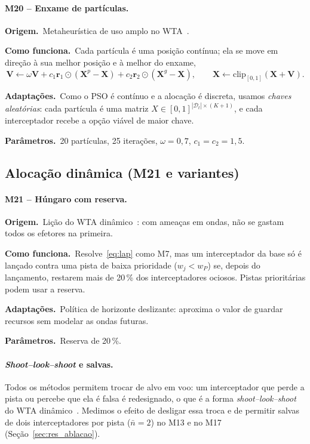 \documentclass[11pt,a4paper]{article}
\newcommand{\orig}{\par\noindent\textbf{Origem.}~}
\newcommand{\func}{\par\noindent\textbf{Como funciona.}~}
\newcommand{\adap}{\par\noindent\textbf{Adaptações.}~}
\newcommand{\parm}{\par\noindent\textbf{Parâmetros.}~}
\begin{document}
\paragraph{M20 -- Enxame de partículas.}
\orig Metaheurística de uso amplo no WTA~\cite{kline2019}.
\func Cada partícula é uma posição contínua; ela se move em direção à sua melhor posição e à melhor do enxame,
\begin{equation}
  \bm{V}\leftarrow\omega\bm{V}+c_1\bm{r}_1\odot(\bm{X}^{p}-\bm{X})+c_2\bm{r}_2\odot(\bm{X}^{g}-\bm{X}),\qquad
  \bm{X}\leftarrow\mathrm{clip}_{[0,1]}(\bm{X}+\bm{V}).
\end{equation}
\adap Como o PSO é contínuo e a alocação é discreta, usamos \emph{chaves aleatórias}: cada partícula é uma matriz
$X\in[0,1]^{|\mathcal{D}_t|\times(K+1)}$, e cada interceptador recebe a opção viável de maior chave.
\parm 20 partículas, 25 iterações, $\omega=0{,}7$, $c_1=c_2=1{,}5$.

\subsection{Alocação dinâmica (M21 e variantes)}

\paragraph{M21 -- Húngaro com reserva.}
\orig Lição do WTA dinâmico~\cite{hosein1990}: com ameaças em ondas, não se gastam todos os efetores na primeira.
\func Resolve~\eqref{eq:lap} como M7, mas um interceptador da base só é lançado contra uma pista de baixa prioridade
($w_j<w_P$) se, depois do lançamento, restarem mais de 20\,\% dos interceptadores ociosos. Pistas prioritárias podem usar a
reserva.
\adap Política de horizonte deslizante: aproxima o valor de guardar recursos sem modelar as ondas futuras.
\parm Reserva de 20\,\%.

\paragraph{\emph{Shoot--look--shoot} e salvas.} Todos os métodos permitem trocar de alvo em voo: um interceptador que
perde a pista ou percebe que ela é falsa é redesignado, o que é a forma \emph{shoot--look--shoot} do WTA
dinâmico~\cite{hosein1990}. Medimos o efeito de desligar essa troca e de permitir salvas de dois interceptadores por pista
($\bar n=2$) no M13 e no M17 (Seção~\ref{sec:res_ablacao}).
\end{document}
